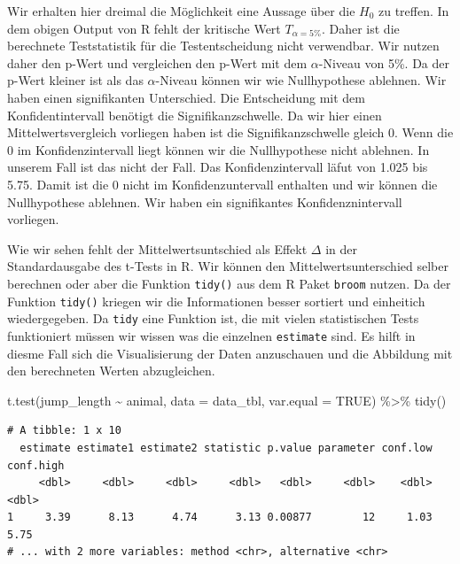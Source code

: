 \documentclass[
  letterpaper,
  DIV=11,
  oneside]{scrreport}
\newenvironment{Shaded}{\begin{snugshade}}{\end{snugshade}}
\newcommand{\AttributeTok}[1]{\textcolor[rgb]{0.40,0.45,0.13}{#1}}
\newcommand{\ConstantTok}[1]{\textcolor[rgb]{0.56,0.35,0.01}{#1}}
\newcommand{\FunctionTok}[1]{\textcolor[rgb]{0.28,0.35,0.67}{#1}}
\newcommand{\NormalTok}[1]{\textcolor[rgb]{0.00,0.23,0.31}{#1}}
\newcommand{\SpecialCharTok}[1]{\textcolor[rgb]{0.37,0.37,0.37}{#1}}
\begin{document}
Wir erhalten hier dreimal die Möglichkeit eine Aussage über die \(H_0\)
zu treffen. In dem obigen Output von R fehlt der kritische Wert
\(T_{\alpha = 5\%}\). Daher ist die berechnete Teststatistik für die
Testentscheidung nicht verwendbar. Wir nutzen daher den p-Wert und
vergleichen den p-Wert mit dem \(\alpha\)-Niveau von 5\%. Da der p-Wert
kleiner ist als das \(\alpha\)-Niveau können wir wie Nullhypothese
ablehnen. Wir haben einen signifikanten Unterschied. Die Entscheidung
mit dem Konfidentintervall benötigt die Signifikanzschwelle. Da wir hier
einen Mittelwertsvergleich vorliegen haben ist die Signifikanzschwelle
gleich 0. Wenn die 0 im Konfidenzintervall liegt können wir die
Nullhypothese nicht ablehnen. In unserem Fall ist das nicht der Fall.
Das Konfidenzintervall läfut von 1.025 bis 5.75. Damit ist die 0 nicht
im Konfidenzuntervall enthalten und wir können die Nullhypothese
ablehnen. Wir haben ein signifikantes Konfidenznintervall vorliegen.

Wie wir sehen fehlt der Mittelwertsuntschied als Effekt \(\Delta\) in
der Standardausgabe des t-Tests in R. Wir können den
Mittelwertsunterschied selber berechnen oder aber die Funktion
\texttt{tidy()} aus dem R Paket \texttt{broom} nutzen. Da der Funktion
\texttt{tidy()} kriegen wir die Informationen besser sortiert und
einheitich wiedergegeben. Da \texttt{tidy} eine Funktion ist, die mit
vielen statistischen Tests funktioniert müssen wir wissen was die
einzelnen \texttt{estimate} sind. Es hilft in diesme Fall sich die
Visualisierung der Daten anzuschauen und die Abbildung mit den
berechneten Werten abzugleichen.

\begin{Shaded}
\begin{Highlighting}[]
\FunctionTok{t.test}\NormalTok{(jump\_length }\SpecialCharTok{\textasciitilde{}}\NormalTok{ animal, }
       \AttributeTok{data =}\NormalTok{ data\_tbl, }\AttributeTok{var.equal =} \ConstantTok{TRUE}\NormalTok{) }\SpecialCharTok{\%\textgreater{}\%} 
  \FunctionTok{tidy}\NormalTok{() }
\end{Highlighting}
\end{Shaded}

\begin{verbatim}
# A tibble: 1 x 10
  estimate estimate1 estimate2 statistic p.value parameter conf.low conf.high
     <dbl>     <dbl>     <dbl>     <dbl>   <dbl>     <dbl>    <dbl>     <dbl>
1     3.39      8.13      4.74      3.13 0.00877        12     1.03      5.75
# ... with 2 more variables: method <chr>, alternative <chr>
\end{verbatim}
\end{document}
